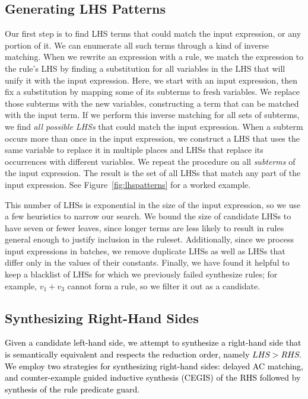 \documentclass[acmsmall]{acmart}\settopmatter{}
\newcommand{\modified}[1]{\textcolor{black}{{#1}}}
\begin{document}
\subsection{Generating LHS Patterns}

  Our first step is to find LHS terms that could match the input expression, or any portion of it. 
We can enumerate all such terms through a kind of inverse matching.
When we rewrite an expression with a rule, 
we match the expression to the rule's LHS by finding a substitution for all variables in
the LHS that will unify it with the input expression. Here, we start with an input expression,
then fix a substitution by mapping some of its subterms to fresh variables. We 
replace those subterms with the new variables, constructing a term that can 
be matched with the input term.
If we perform this inverse matching for all sets of subterms, we find \emph{all possible LHSs} that could match the
input expression. 
When a subterm occurs more than once in the input expression, we construct a LHS that 
uses the same variable to replace it in multiple places and LHSs that replace its
occurrences with different variables.
We repeat the procedure on all \emph{subterms} of the input expression.  The result is the set of all 
LHSs that match any part of the input expression. See Figure~\ref{fig:lhspatterns} for a worked example.

This number of LHSs is exponential in the size of the input expression, so we use a few heuristics to narrow 
our search. We bound the size of candidate LHSs to have seven or fewer leaves, since longer terms are less likely to 
result in rules general enough to justify inclusion in the ruleset. 
Additionally, since we process input expressions in batches, we remove 
duplicate LHSs as well as LHSs that differ only in the values of their constants. 
Finally, we have found it helpful to keep a blacklist of LHSs for which we previously
failed synthesize rules; for example, $v_1 + v_3$ 
cannot form a rule, so we filter it out as a candidate.

\subsection{Synthesizing Right-Hand Sides} 
\label{sec:synthesizing-candidate-rules}
\modified{%
Given a candidate left-hand side, we attempt to 
synthesize a right-hand side that is semantically equivalent and
respects the reduction order, namely $\mathit{LHS} > \mathit{RHS}$.
We employ two strategies for synthesizing right-hand sides:
delayed AC matching, and counter-example guided inductive synthesis (CEGIS) of 
the RHS followed by synthesis of the rule predicate guard.} 
\end{document}
